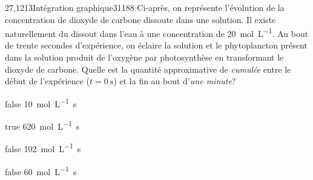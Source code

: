 		\begin{question}{27,1213}{Intégration graphique}{3}{1188}
             Ci-après, on représente l'évolution de la concentration de dioxyde de carbone dissoute dans une solution. Il existe naturellement du  dissout dans l'eau à une concentration de \SI{20}{\mol\per\liter}. Au bout de trente secondes d'expérience, on éclaire la solution et le phytoplancton présent dans la solution produit de l'oxygène par photosynthèse en transformant le dioxyde de carbone. Quelle est la quantité approximative de  \emph{cumulée} entre le début de l'expérience ($t=\SI{0}{\second}$) et la fin au bout d'\emph{une minute}?
            \begin{figure}
             \end{figure}
        \end{question}
        \begin{reponses}
            \item[false] \SI{10}{\mol\per\liter.\second}
		    \item[true] \SI{620}{\mol\per\liter.\second}
		    \item[false] \SI{102}{\mol\per\liter.\second}
		    \item[false] \SI{60}{\mol\per\liter.\second}
		    \end{reponses}
